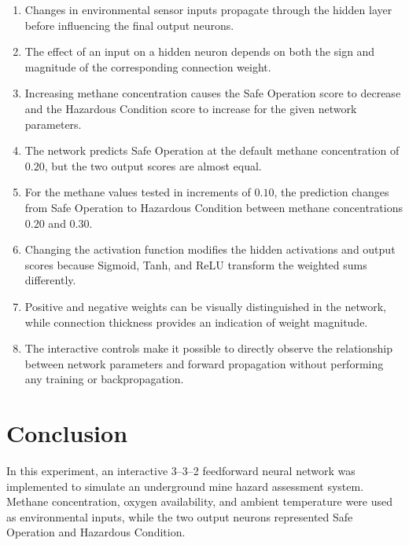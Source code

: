 \documentclass[12pt]{article}
\begin{document}
\begin{enumerate}

    \item Changes in environmental sensor inputs propagate through the
    hidden layer before influencing the final output neurons.

    \item The effect of an input on a hidden neuron depends on both the
    sign and magnitude of the corresponding connection weight.

    \item Increasing methane concentration causes the Safe Operation
    score to decrease and the Hazardous Condition score to increase
    for the given network parameters.

    \item The network predicts Safe Operation at the default methane
    concentration of $0.20$, but the two output scores are almost
    equal.

    \item For the methane values tested in increments of $0.10$, the
    prediction changes from Safe Operation to Hazardous Condition
    between methane concentrations $0.20$ and $0.30$.

    \item Changing the activation function modifies the hidden
    activations and output scores because Sigmoid, Tanh, and ReLU
    transform the weighted sums differently.

    \item Positive and negative weights can be visually distinguished
    in the network, while connection thickness provides an indication
    of weight magnitude.

    \item The interactive controls make it possible to directly
    observe the relationship between network parameters and forward
    propagation without performing any training or backpropagation.

\end{enumerate}


\section{Conclusion}

In this experiment, an interactive 3--3--2 feedforward neural network
was implemented to simulate an underground mine hazard assessment
system. Methane concentration, oxygen availability, and ambient
temperature were used as environmental inputs, while the two output
neurons represented Safe Operation and Hazardous Condition.
\end{document}
